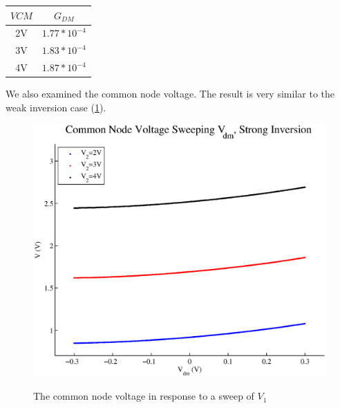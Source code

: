 \documentclass{article}
\begin{document}
\begin{center}
\begin{tabular} {|c|c|}
\hline
$V{CM}$ & $G_{DM}$ \\ 
\hline
2V  & $1.77 *10^{-4}$ \\
3V & $1.83 *10^{-4}$ \\
4V & $1.87 *10^{-4}$ \\
\hline
\end{tabular}
\end{center}

We also examined the common node voltage. The result is very similar to the weak inversion case (\ref{strongV}).

\begin{figure}[H]
\centering
\includegraphics[scale=.7]{plot_strong_v.eps}
\label{strongV}
\caption{The common node voltage in response to a sweep of $V_1$}
\end{figure}
\end{document}

